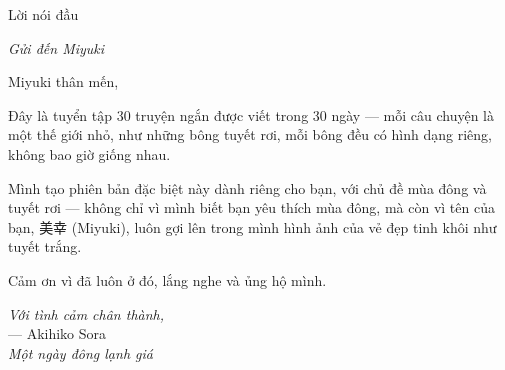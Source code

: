 
\thispagestyle{empty}
\vspace*{2cm}

\begin{center}
    \textcolor{ice_blue}{}
    \vspace{0.5cm}
    
    {\titlefont\large\textcolor{winter_blue}{Lời nói đầu}}
    
    \vspace{0.3cm}
    
    {\footnotesize\textit{Gửi đến Miyuki}}
    
    \vspace{0.5cm}
    \textcolor{ice_blue}{}
\end{center}

\vspace{1cm}

\noindent
Miyuki thân mến,

\vspace{0.5cm}

\noindent
Đây là tuyển tập 30 truyện ngắn được viết trong 30 ngày — mỗi câu chuyện là một thế giới nhỏ, như những bông tuyết rơi, mỗi bông đều có hình dạng riêng, không bao giờ giống nhau.

\vspace{0.5cm}

\noindent
Mình tạo phiên bản đặc biệt này dành riêng cho bạn, với chủ đề mùa đông và tuyết rơi — không chỉ vì mình biết bạn yêu thích mùa đông, mà còn vì tên của bạn, {\japanesefont 美幸} (Miyuki), luôn gợi lên trong mình hình ảnh của vẻ đẹp tinh khôi như tuyết trắng.

\vspace{0.5cm}

\noindent
Cảm ơn vì đã luôn ở đó, lắng nghe và ủng hộ mình.

\vspace{1cm}

\begin{flushright}
    \textcolor{winter_blue}{\textit{Với tình cảm chân thành,}}\\[0.3cm]
    {\handwritingfont\textcolor{winter_blue}{--- Akihiko Sora}}\\[0.2cm]
    {\footnotesize\textcolor{frost_blue}{\textit{Một ngày đông lạnh giá}}}
\end{flushright}

\clearpage